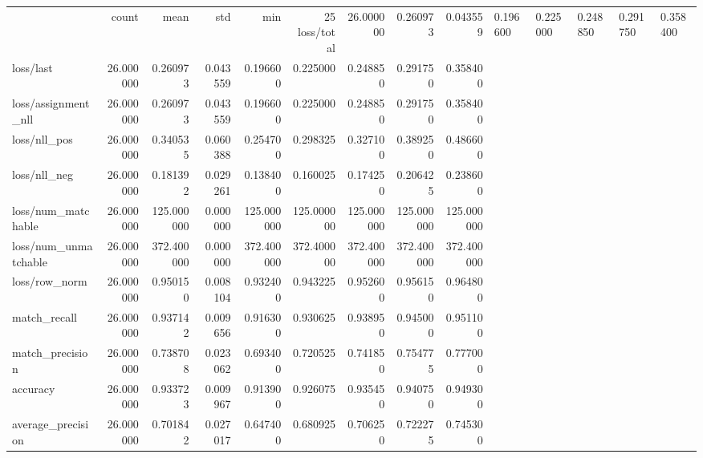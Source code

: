 \begin{tabular}{lrrrrrrrr}
\toprule
 & count & mean & std & min & 25%
\midrule
loss/total & 26.000000 & 0.260973 & 0.043559 & 0.196600 & 0.225000 & 0.248850 & 0.291750 & 0.358400 \\
loss/last & 26.000000 & 0.260973 & 0.043559 & 0.196600 & 0.225000 & 0.248850 & 0.291750 & 0.358400 \\
loss/assignment_nll & 26.000000 & 0.260973 & 0.043559 & 0.196600 & 0.225000 & 0.248850 & 0.291750 & 0.358400 \\
loss/nll_pos & 26.000000 & 0.340535 & 0.060388 & 0.254700 & 0.298325 & 0.327100 & 0.389250 & 0.486600 \\
loss/nll_neg & 26.000000 & 0.181392 & 0.029261 & 0.138400 & 0.160025 & 0.174250 & 0.206425 & 0.238600 \\
loss/num_matchable & 26.000000 & 125.000000 & 0.000000 & 125.000000 & 125.000000 & 125.000000 & 125.000000 & 125.000000 \\
loss/num_unmatchable & 26.000000 & 372.400000 & 0.000000 & 372.400000 & 372.400000 & 372.400000 & 372.400000 & 372.400000 \\
loss/row_norm & 26.000000 & 0.950150 & 0.008104 & 0.932400 & 0.943225 & 0.952600 & 0.956150 & 0.964800 \\
match_recall & 26.000000 & 0.937142 & 0.009656 & 0.916300 & 0.930625 & 0.938950 & 0.945000 & 0.951100 \\
match_precision & 26.000000 & 0.738708 & 0.023062 & 0.693400 & 0.720525 & 0.741850 & 0.754775 & 0.777000 \\
accuracy & 26.000000 & 0.933723 & 0.009967 & 0.913900 & 0.926075 & 0.935450 & 0.940750 & 0.949300 \\
average_precision & 26.000000 & 0.701842 & 0.027017 & 0.647400 & 0.680925 & 0.706250 & 0.722275 & 0.745300 \\
\bottomrule
\end{tabular}

